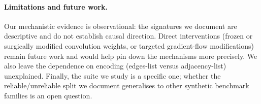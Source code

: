\documentclass[11pt]{article}
\begin{document}
\paragraph{Limitations and future work.}
Our mechanistic evidence is observational: the signatures we document are descriptive and
do not establish causal direction. Direct interventions (frozen or surgically modified
convolution weights, or targeted gradient-flow modifications) remain future work and would
help pin down the mechanisms more precisely. We also leave the dependence on encoding
(edges-list versus adjacency-list) unexplained. Finally, the suite we study is a specific
one; whether the reliable/unreliable split we document generalises to other synthetic
benchmark families is an open question.




\end{document}

